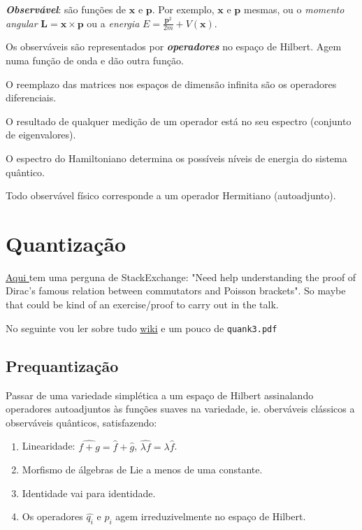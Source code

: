 \begin{defn}
	\textit{\textbf{Observ\'avel}}: s\~ao fun\c c\~oes  de $\mathbf{x}$ e $\mathbf{p}$. Por exemplo, $\mathbf{x}$ e $\mathbf{p}$ mesmas, ou o \textit{momento angular} $\mathbf{L}=\mathbf{x}\times \mathbf{p}$ ou a \textit{energia} $E=\frac{\mathbf{p}^2}{2m}+V(\mathbf{x})$.

	Os observ\'aveis s\~ao representados por \textit{\textbf{operadores}} no espaço de Hilbert. Agem numa fun\c c\~ao de onda e d\~ao outra fun\c c\~ao.
\end{defn}

\begin{remark}
	O reemplazo das matrices nos espaços de dimens\~ao infinita s\~ao os operadores diferenciais.
\end{remark}

\begin{remark}
	O resultado de qualquer medi\c c\~ao de um operador est\'a no seu espectro (conjunto de eigenvalores).
\end{remark}

O espectro do Hamiltoniano determina os poss\'iveis n\'iveis de energia do sistema qu\^antico.

Todo observ\'avel f\'isico corresponde a um operador Hermitiano (autoadjunto).


\section{Quantização}

\href{https://math.stackexchange.com/questions/4540394/need-help-understanding-the-proof-of-diracs-famous-relation-between-commutators}{Aqui } tem uma perguna de StackExchange: "Need help understanding the proof of Dirac's famous relation between commutators and Poisson brackets". So maybe that could be kind of an exercise/proof to carry out in the talk.

No seguinte vou ler sobre tudo \href{https://en.wikipedia.org/wiki/Geometric_quantization}{wiki} e um pouco de  \texttt{quank3.pdf}

\subsection{Prequantização}

Passar de uma variedade simplética a um espaço de Hilbert assinalando operadores autoadjuntos às funções suaves na variedade, ie. oberváveis clássicos a observáveis quânticos, satisfazendo:
\begin{enumerate}
	\item Linearidade: $\widehat{f+g}=\hat{f}+\hat{g}$, $\widehat{\lambda f}=\lambda\hat{f}$.
	\item Morfismo de álgebras de Lie a menos de uma constante.
	\item Identidade vai para identidade.
	\item Os operadores $\hat{q_i}$ e $\hat{p_i}$ agem irreduzivelmente no espaço de Hilbert.
\end{enumerate}


